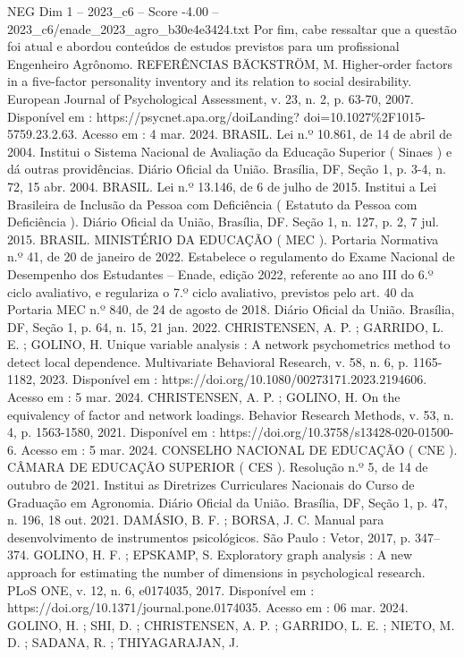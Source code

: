 \begin{textsample}{NEG Dim 1 – 2023\_c6 – Score -4.00 – 2023\_c6/enade\_2023\_agro\_b30e4e3424.txt}
Por fim, cabe ressaltar que a questão foi atual e abordou conteúdos de estudos previstos para um profissional Engenheiro Agrônomo.
REFERÊNCIAS BÄCKSTRÖM, M.
Higher-order factors in a five-factor personality inventory and its relation to social desirability.
European Journal of Psychological Assessment, v. 23, n. 2, p. 63-70, 2007.
Disponível em : https://psycnet.apa.org/doiLanding? doi=10.1027\%2F1015-5759.23.2.63.
Acesso em : 4 mar. 2024.
BRASIL.
Lei n.º 10.861, de 14 de abril de 2004.
Institui o Sistema Nacional de Avaliação da Educação Superior ( Sinaes ) e dá outras providências.
Diário Oficial da União.
Brasília, DF, Seção 1, p. 3-4, n. 72, 15 abr. 2004.
BRASIL.
Lei n.º 13.146, de 6 de julho de 2015.
Institui a Lei Brasileira de Inclusão da Pessoa com Deficiência ( Estatuto da Pessoa com Deficiência ).
Diário Oficial da União, Brasília, DF.
Seção 1, n. 127, p. 2, 7 jul. 2015.
BRASIL.
MINISTÉRIO DA EDUCAÇÃO ( MEC ).
Portaria Normativa n.º 41, de 20 de janeiro de 2022.
Estabelece o regulamento do Exame Nacional de Desempenho dos Estudantes – Enade, edição 2022, referente ao ano III do 6.º ciclo avaliativo, e regulariza o 7.º ciclo avaliativo, previstos pelo art. 40 da Portaria MEC n.º 840, de 24 de agosto de 2018.
Diário Oficial da União.
Brasília, DF, Seção 1, p. 64, n. 15, 21 jan. 2022.
CHRISTENSEN, A.
P. ; GARRIDO, L.
E. ; GOLINO, H.
Unique variable analysis : A network psychometrics method to detect local dependence.
Multivariate Behavioral Research, v. 58, n. 6, p. 1165-1182, 2023.
Disponível em : https://doi.org/10.1080/00273171.2023.2194606.
Acesso em : 5 mar. 2024.
CHRISTENSEN, A.
P. ; GOLINO, H.
On the equivalency of factor and network loadings.
Behavior Research Methods, v. 53, n. 4, p. 1563-1580, 2021.
Disponível em : https://doi.org/10.3758/s13428-020-01500-6.
Acesso em : 5 mar. 2024.
CONSELHO NACIONAL DE EDUCAÇÃO ( CNE ).
CÂMARA DE EDUCAÇÃO SUPERIOR ( CES ).
Resolução n.º 5, de 14 de outubro de 2021.
Institui as Diretrizes Curriculares Nacionais do Curso de Graduação em Agronomia.
Diário Oficial da União.
Brasília, DF, Seção 1, p. 47, n. 196, 18 out. 2021.
DAMÁSIO, B.
F. ; BORSA, J.
C.
Manual para desenvolvimento de instrumentos psicológicos.
São Paulo : Vetor, 2017, p. 347–374.
GOLINO, H.
F. ; EPSKAMP, S.
Exploratory graph analysis : A new approach for estimating the number of dimensions in psychological research.
PLoS ONE, v. 12, n. 6, e0174035, 2017.
Disponível em : https://doi.org/10.1371/journal.pone.0174035.
Acesso em : 06 mar. 2024.
GOLINO, H. ; SHI, D. ; CHRISTENSEN, A.
P. ; GARRIDO, L.
E. ; NIETO, M.
D. ; SADANA, R. ; THIYAGARAJAN, J.

\end{textsample}
